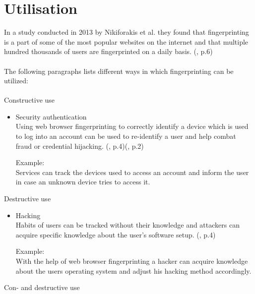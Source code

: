 \section{Utilisation}\label{sec:utilisation}
In a study conducted in 2013 by Nikiforakis et al. they found that fingerprinting is a part of some of the most popular websites on the internet and that multiple hundred thousands of users are fingerprinted on a daily basis. (\textcite{nikiforakis13}, p.6) \\\\
The following paragraphs lists different ways in which fingerprinting can be utilized:\\\\
Constructive use
\begin{itemize}
	\item Security authentication\\
	Using web browser fingerprinting to correctly identify a device which is used to log into an account can be used to re-identify a user and help combat fraud or credential hijacking. (\textcite{upi15}, p.4)(\textcite{nikiforakis13}, p.2)
	\begin{tcolorbox}
	Example:\\
	Services can track the devices used to access an account and inform the user in case an unknown device tries to access it. 
	\end{tcolorbox}
\end{itemize}
Destructive use
\begin{itemize}
	\item Hacking\\
	Habits of users can be tracked without their knowledge and attackers can acquire specific knowledge about the user’s software setup. (\textcite{upi15}, p.4) 
	\begin{tcolorbox}
	Example:\\
	With the help of web browser fingerprinting a hacker can acquire knowledge about the users operating system and adjust his hacking method accordingly.
	\end{tcolorbox}
\end{itemize}
Con- and destructive use
